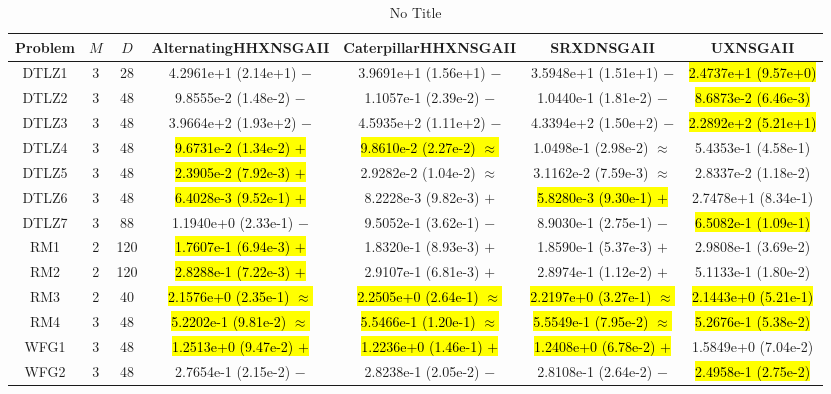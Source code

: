 \documentclass[journal]{IEEEtran}
\begin{document}
\begin{table*}[htbp]
\renewcommand{\arraystretch}{1.2}
\centering
\caption{No Title}
\begin{tabular}{ccccccc}
\toprule
Problem&$M$&$D$&AlternatingHHXNSGAII&CaterpillarHHXNSGAII&SRXDNSGAII&UXNSGAII\\
\midrule
\multirow{1}{*}{DTLZ1}&3&28&4.2961e+1 (2.14e+1) $-$&3.9691e+1 (1.56e+1) $-$&3.5948e+1 (1.51e+1) $-$&\hl{2.4737e+1 (9.57e+0)}\\
\hline
\multirow{1}{*}{DTLZ2}&3&48&9.8555e-2 (1.48e-2) $-$&1.1057e-1 (2.39e-2) $-$&1.0440e-1 (1.81e-2) $-$&\hl{8.6873e-2 (6.46e-3)}\\
\hline
\multirow{1}{*}{DTLZ3}&3&48&3.9664e+2 (1.93e+2) $-$&4.5935e+2 (1.11e+2) $-$&4.3394e+2 (1.50e+2) $-$&\hl{2.2892e+2 (5.21e+1)}\\
\hline
\multirow{1}{*}{DTLZ4}&3&48&\hl{9.6731e-2 (1.34e-2) $+$}&\hl{9.8610e-2 (2.27e-2) $\approx$}&1.0498e-1 (2.98e-2) $\approx$&5.4353e-1 (4.58e-1)\\
\hline
\multirow{1}{*}{DTLZ5}&3&48&\hl{2.3905e-2 (7.92e-3) $+$}&2.9282e-2 (1.04e-2) $\approx$&3.1162e-2 (7.59e-3) $\approx$&2.8337e-2 (1.18e-2)\\
\hline
\multirow{1}{*}{DTLZ6}&3&48&\hl{6.4028e-3 (9.52e-1) $+$}&8.2228e-3 (9.82e-3) $+$&\hl{5.8280e-3 (9.30e-1) $+$}&2.7478e+1 (8.34e-1)\\
\hline
\multirow{1}{*}{DTLZ7}&3&88&1.1940e+0 (2.33e-1) $-$&9.5052e-1 (3.62e-1) $-$&8.9030e-1 (2.75e-1) $-$&\hl{6.5082e-1 (1.09e-1)}\\
\hline
\multirow{1}{*}{RM1}&2&120&\hl{1.7607e-1 (6.94e-3) $+$}&1.8320e-1 (8.93e-3) $+$&1.8590e-1 (5.37e-3) $+$&2.9808e-1 (3.69e-2)\\
\hline
\multirow{1}{*}{RM2}&2&120&\hl{2.8288e-1 (7.22e-3) $+$}&2.9107e-1 (6.81e-3) $+$&2.8974e-1 (1.12e-2) $+$&5.1133e-1 (1.80e-2)\\
\hline
\multirow{1}{*}{RM3}&2&40&\hl{2.1576e+0 (2.35e-1) $\approx$}&\hl{2.2505e+0 (2.64e-1) $\approx$}&\hl{2.2197e+0 (3.27e-1) $\approx$}&\hl{2.1443e+0 (5.21e-1)}\\
\hline
\multirow{1}{*}{RM4}&3&48&\hl{5.2202e-1 (9.81e-2) $\approx$}&\hl{5.5466e-1 (1.20e-1) $\approx$}&\hl{5.5549e-1 (7.95e-2) $\approx$}&\hl{5.2676e-1 (5.38e-2)}\\
\hline
\multirow{1}{*}{WFG1}&3&48&\hl{1.2513e+0 (9.47e-2) $+$}&\hl{1.2236e+0 (1.46e-1) $+$}&\hl{1.2408e+0 (6.78e-2) $+$}&1.5849e+0 (7.04e-2)\\
\hline
\multirow{1}{*}{WFG2}&3&48&2.7654e-1 (2.15e-2) $-$&2.8238e-1 (2.05e-2) $-$&2.8108e-1 (2.64e-2) $-$&\hl{2.4958e-1 (2.75e-2)}\\

\end{tabular}
\end{table*}
\end{document}
